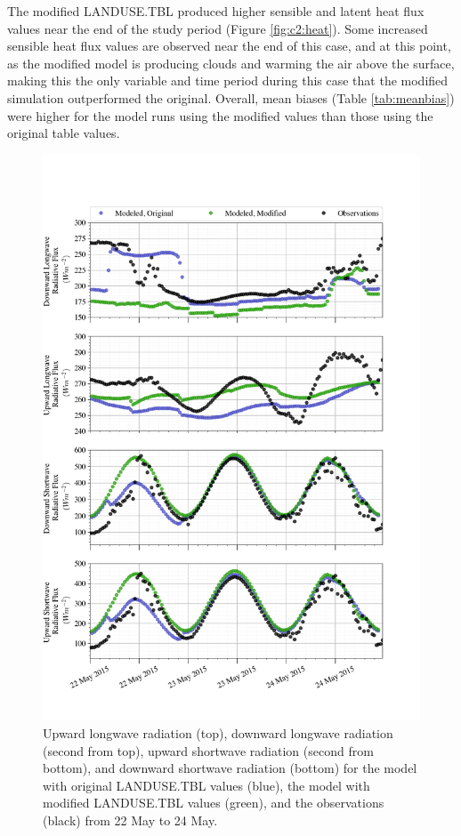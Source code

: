 The modified LANDUSE.TBL produced higher sensible and latent heat flux values near the end of the study period (Figure \ref{fig:c2:heat}). Some increased sensible heat flux values are observed near the end of this case, and at this point, as the modified model is producing clouds and warming the air above the surface, making this the only variable and time period during this case that the modified simulation outperformed the original. Overall, mean biases (Table \ref{tab:meanbias}) were higher for the model runs using the modified values than those using the original table values.

\begin{figure}[p!]
    \centering
    \vspace{-10em}
    \includegraphics[width=1\linewidth]{figures/chapter6/case3_lw_sw.png}
    \caption[Idealized Case 3 - Longwave radiation.]{Upward longwave radiation (top), downward longwave radiation (second from top), upward shortwave radiation (second from bottom), and downward shortwave radiation (bottom) for the model with original LANDUSE.TBL values (blue), the model with modified LANDUSE.TBL values (green), and the observations (black) from 22 May to 24 May.}    
    \label{fig:c3:radiative}
\end{figure}

